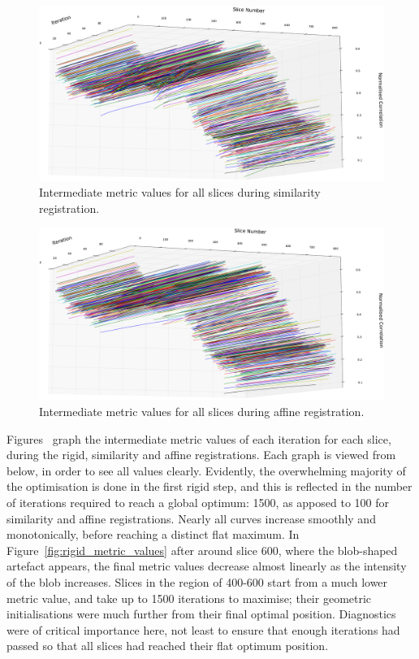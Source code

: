   \begin{figure}
    \centering
    \includegraphics[width=\textheight]{Ch5/Figs/diagnostics/similarity_metric_values}
    \caption{Intermediate metric values for all slices during similarity registration.}
    \label{fig:similarity_metric_values}
  \end{figure}
      
  \begin{figure}
    \centering
    \includegraphics[width=\textheight]{Ch5/Figs/diagnostics/affine_metric_values}
    \caption{Intermediate metric values for all slices during affine registration.}
    \label{fig:affine_metric_values}
  \end{figure}
  
	Figures~ graph the intermediate metric values of each iteration for each slice, during the rigid, similarity and affine registrations. Each graph is viewed from below, in order to see all values clearly. Evidently, the overwhelming majority of the optimisation is done in the first rigid step, and this is reflected in the number of iterations required to reach a global optimum: 1500, as apposed to 100 for similarity and affine registrations. Nearly all curves increase smoothly and monotonically, before reaching a distinct flat maximum. In Figure~\ref{fig:rigid_metric_values} after around slice 600, where the blob-shaped artefact appears, the final metric values decrease almost linearly as the intensity of the blob increases. Slices in the region of 400-600 start from a much lower metric value, and take up to 1500 iterations to maximise; their geometric initialisations were much further from their final optimal position. Diagnostics were of critical importance here, not least to ensure that enough iterations had passed so that all slices had reached their flat optimum position.
	

